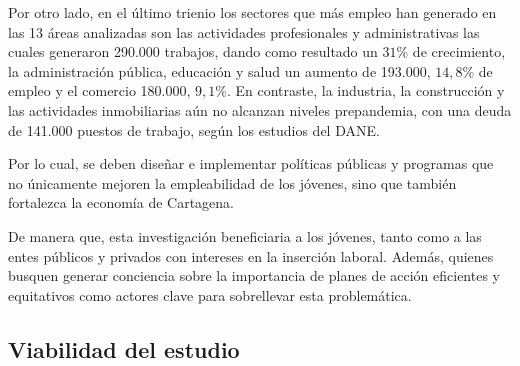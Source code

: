 \documentclass[letterpaper, 12pt]{article}
\begin{document}
Por otro lado, en el último trienio los sectores que más empleo han generado en las 
13 áreas analizadas son las actividades profesionales y administrativas las cuales 
generaron 290.000 trabajos, dando como resultado un $31\%$ de crecimiento, la 
administración pública, educación y salud un aumento de 193.000, $14,8\%$ de 
empleo y el comercio 180.000, $9,1\%$. En contraste, la industria, la 
construcción y las actividades inmobiliarias aún no alcanzan niveles 
prepandemia, con una deuda de 141.000 puestos de trabajo, según los estudios del DANE. 


Por lo cual, se deben diseñar e implementar políticas públicas y programas que no 
únicamente mejoren la empleabilidad de los jóvenes, sino que también fortalezca 
la economía de Cartagena.  

De manera que, esta investigación beneficiaria a los jóvenes, tanto como 
a las entes públicos y privados con intereses en la inserción laboral. Además, 
quienes busquen generar conciencia sobre la importancia de planes de 
acción eficientes y equitativos como actores clave para sobrellevar 
esta problemática.

\subsection{Viabilidad del estudio}
\end{document}
